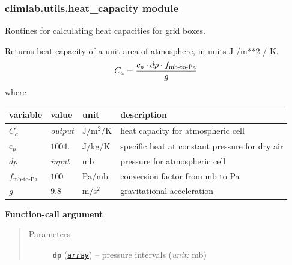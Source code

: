 \documentclass[a4paper,10pt,english]{sphinxmanual}
\begin{document}
\subsubsection{climlab.utils.heat\_capacity module}
\label{api/climlab.utils:module-climlab.utils.heat_capacity}\label{api/climlab.utils:climlab-utils-heat-capacity-module}
Routines for calculating heat capacities for grid boxes.

\begin{fulllineitems}
\label{api/climlab.utils:climlab.utils.heat_capacity.atmosphere}
Returns heat capacity of a unit area of atmosphere, in units J /m**2 / K.
\begin{gather}
\begin{split}C_a = \frac{c_p \cdot dp \cdot f_{\textrm{mb-to-Pa}}}{g}\end{split}\notag
\end{gather}
where

\begin{tabulary}{\linewidth}{|L|L|L|L|}
\hline
\textsf{\relax 
variable
} & \textsf{\relax 
value
} & \textsf{\relax 
unit
} & \textsf{\relax 
description
}\\
\hline
\(C_a\)
 & 
\emph{output}
 & 
\(\textrm{J} / \textrm{m}^2 / \textrm{K}\)
 & 
heat capacity for atmospheric cell
\\
\hline
\(c_p\)
 & 
\(1004.\)
 & 
\(\textrm{J} / \textrm{kg} / \textrm{K}\)
 & 
specific heat at constant pressure for dry air
\\
\hline
\(dp\)
 & 
\emph{input}
 & 
\(\textrm{mb}\)
 & 
pressure for atmospheric cell
\\
\hline
\(f_{\textrm{mb-to-Pa}}\)
 & 
\(100\)
 & 
\(\textrm{Pa} / \textrm{mb}\)
 & 
conversion factor from mb to Pa
\\
\hline
\(g\)
 & 
\(9.8\)
 & 
\(\textrm{m} / \textrm{s}^2\)
 & 
gravitational acceleration
\\
\hline\end{tabulary}


\textbf{Function-call argument}
\begin{quote}\begin{description}
\item[{Parameters}] \leavevmode
\textbf{\texttt{dp}} (\href{http://docs.python.org/2.7/library/array.html\#module-array}{\emph{\texttt{array}}}) -- pressure intervals (\emph{unit:} mb)


\end{description}
\end{quote}
\end{fulllineitems}
\end{document}

